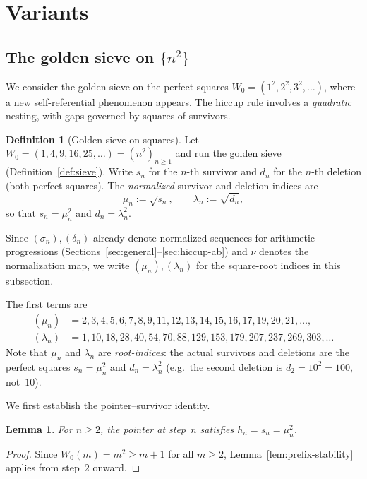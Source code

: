 \documentclass[11pt]{article}
\numberwithin{equation}{section}
\theoremstyle{plain}
\newtheorem{lemma}[theorem]{Lemma}
\theoremstyle{definition}
\newtheorem{definition}[theorem]{Definition}
\theoremstyle{remark}
\begin{document}
\section{Variants}\label{sec:variants}

\subsection{The golden sieve on \texorpdfstring{$\{n^2\}$}{squares}}\label{sec:squares}

We consider the golden sieve on the perfect squares
$W_0=(1^2,2^2,3^2,\ldots)$, where a new self-referential
phenomenon appears.  The hiccup rule involves a \emph{quadratic} nesting,
with gaps governed by squares of survivors.

\begin{definition}[Golden sieve on squares]\label{def:squaresieve}
Let $W_0=(1,4,9,16,25,\ldots)=(n^2)_{n\ge1}$ and run the golden sieve
(Definition~\ref{def:sieve}).  Write $s_n$ for the $n$-th survivor and $d_n$
for the $n$-th deletion (both perfect squares).  The \emph{normalized}
survivor and deletion indices are
\[
  \mu_n:=\sqrt{s_n},\qquad \lambda_n:=\sqrt{d_n},
\]
so that $s_n=\mu_n^2$ and $d_n=\lambda_n^2$.
\end{definition}
\noindent
Since $(\sigma_n),(\delta_n)$ already denote normalized sequences for
arithmetic progressions
(Sections~\ref{sec:general}--\ref{sec:hiccup-ab}) and $\nu$ denotes
the normalization map, we write $(\mu_n),(\lambda_n)$ for the
square-root indices in this subsection.

The first terms are
\begin{align*}
  (\mu_n) &= 2,3,4,5,6,7,8,9,11,12,13,14,15,16,17,19,20,21,\ldots,\\
  (\lambda_n) &= 1,10,18,28,40,54,70,88,129,153,179,207,237,269,303,\ldots
\end{align*}
Note that $\mu_n$ and $\lambda_n$ are \emph{root-indices}: the actual
survivors and deletions are the perfect squares $s_n=\mu_n^2$ and
$d_n=\lambda_n^2$ (e.g.\ the second deletion is $d_2=10^2=100$, not~$10$).

We first establish the pointer--survivor identity.

\begin{lemma}\label{lem:squares-pointer}
For $n\ge2$, the pointer at step~$n$ satisfies $h_n=s_n=\mu_n^2$.
\end{lemma}

\begin{proof}
Since $W_0(m)=m^2\ge m+1$ for all $m\ge2$, Lemma~\ref{lem:prefix-stability}
applies from step~$2$ onward.
\end{proof}
\end{document}
